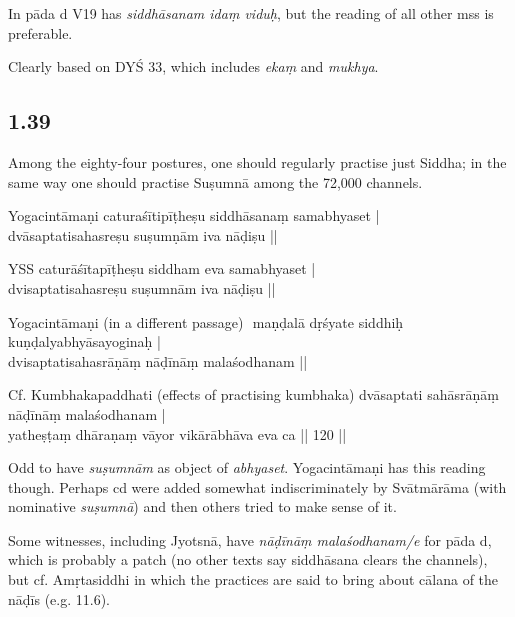 \begin{ekdosis}
\begin{philcomm}[hp01_038]
In pāda d V19 has \emph{siddhāsanam idaṃ viduḥ}, but the reading of all other mss is preferable.

Clearly based on DYŚ 33, which includes \emph{ekaṃ} and \emph{mukhya}.
\end{philcomm}

\subsection*{1.39}
\begin{translation}[hp01_039]
Among the eighty-four postures, one should regularly practise just Siddha; in the same way one should practise Suṣumnā among the 72,000 channels.
\end{translation}

\begin{sources}[hp01_039]
\end{sources}

\begin{testimonia}[hp01_039]
Yogacintāmaṇi
\startverse
caturaśītipīṭheṣu siddhāsanaṃ samabhyaset | \\
dvāsaptatisahasreṣu suṣumṇām iva nāḍiṣu ||
\endverse

YSS
\startverse
caturāśītapīṭheṣu siddham eva samabhyaset |\\
dvisaptatisahasreṣu suṣumnām iva nāḍiṣu ||
\endverse

Yogacintāmaṇi (in a different passage)
​​\startverse
maṇḍalā dṛśyate siddhiḥ kuṇḍalyabhyāsayoginaḥ |\\
dvisaptatisahasrāṇāṃ nāḍīnāṃ malaśodhanam ||
\endverse

Cf. Kumbhakapaddhati (effects of practising kumbhaka)
\startverse
dvāsaptati sahāsrāṇāṃ nāḍīnāṃ malaśodhanam |\\
yatheṣṭaṃ dhāraṇaṃ vāyor vikārābhāva eva ca || 120 ||
\endverse
\end{testimonia}

\begin{philcomm}[hp01_039]
Odd to have \emph{suṣumnām} as object of \emph{abhyaset}. Yogacintāmaṇi has this reading though. Perhaps cd were added somewhat indiscriminately by Svātmārāma (with nominative \emph{suṣumnā}) and then others tried to make sense of it.

Some witnesses, including Jyotsnā, have \emph{nāḍīnāṃ malaśodhanam/e} for pāda d, which is probably a patch (no other texts say siddhāsana clears the channels), but cf. Amṛtasiddhi in which the practices are said to bring about cālana of the nāḍīs (e.g. 11.6).


\end{philcomm}
\end{ekdosis}
